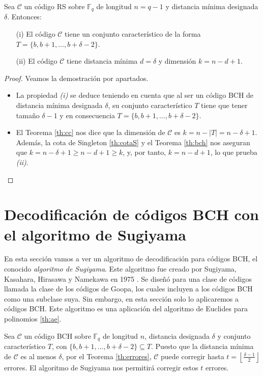 \begin{teorema}
Sea $\mathcal{C}$ un código RS sobre $\mathbb{F}_q$ de longitud $n = q-1$ y distancia mínima designada $\delta$. Entonces:
\begin{itemize}
  \item[(i)] El código $\mathcal{C}$ tiene un conjunto característico de la forma $T = \{b,b+1,\dots,b+\delta-2\}$.
  \item[(ii)] El código $\mathcal{C}$ tiene distancia mínima $d = \delta$ y dimensión $k = n-d+1$. 
\end{itemize}
\end{teorema}

\begin{proof}
Veamos la demostración por apartados.
\begin{itemize} 
  \item La propiedad \textit{(i)} se deduce teniendo en cuenta que al ser un código BCH de distancia mínima designada $\delta$, su conjunto característico $T$ tiene que tener tamaño $\delta - 1$ y en consecuencia $T = \{b,b+1,\dots,b+\delta-2\}$.
  \item El Teorema \ref{th:cc} nos dice que la dimensión de $\mathcal{C}$ es $k = n - |T| = n - \delta + 1$. Además, la cota de Singleton \ref{th:cotaS} y el Teorema \ref{th:bch} nos aseguran que $k = n - \delta + 1 \geq n - d + 1 \geq k$, y, por tanto, $k = n - d + 1$, lo que prueba \textit{(ii)}.
\end{itemize}
\end{proof}

\section{Decodificación de códigos BCH con el algoritmo de Sugiyama}\label{sec:sugiyama}

En esta sección vamos a ver un algoritmo de decodificación para códigos BCH, el conocido \emph{algoritmo de Sugiyama}. Este algoritmo fue creado por Sugiyama, Kasahara, Hirasawa y Namekawa en 1975 \cite{sugiyama1975method}. Se diseñó para una clase de códigos llamada la clase de los códigos de Goopa, los cuales incluyen a los códigos BCH como una subclase suya. Sin embargo, en esta sección solo lo aplicaremos a códigos BCH. Este algoritmo es una aplicación del algoritmo de Euclides para polinomios \ref{th:ae}.
 
Sea $\mathcal{C}$ un código BCH sobre $\mathbb{F}_q$ de longitud $n$, distancia designada $\delta$ y conjunto característico $T$, con $\{b,b+1,\dots,b + \delta - 2\} \subseteq T$. Puesto que la distancia mínima de $\mathcal{C}$ es al menos $\delta$, por el Teorema \ref{th:errores}, $\mathcal{C}$ puede corregir hasta $ t = \left\lfloor \frac{\delta-1}{2} \right\rfloor $ errores. El algoritmo de Sugiyama nos permitirá corregir estos $t$ errores.

